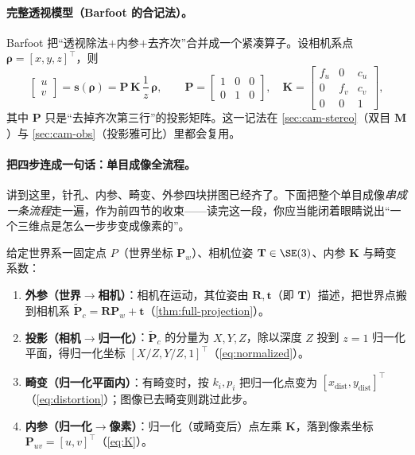\paragraph{完整透视模型（Barfoot 的合记法）。}
Barfoot\cite{barfoot2024state} 把“透视除法$+$内参$+$去齐次”合并成一个紧凑算子。设相机系点 $\boldsymbol\rho=[x,y,z]^\top$，则
\begin{equation}
  \begin{bmatrix}u\\v\end{bmatrix}=\mathbf{s}(\boldsymbol\rho)=\mathbf{P}\,\mathbf{K}\,\frac1z\,\boldsymbol\rho,\qquad
  \mathbf{P}=\begin{bmatrix}1&0&0\\0&1&0\end{bmatrix},\quad
  \mathbf{K}=\begin{bmatrix}f_u&0&c_u\\0&f_v&c_v\\0&0&1\end{bmatrix},
  \label{eq:complete-perspective}
\end{equation}
其中 $\mathbf{P}$ 只是“去掉齐次第三行”的投影矩阵。这一记法在 \cref{sec:cam-stereo}（双目 $\mathbf{M}$）与 \cref{sec:cam-obs}（投影雅可比）里都会复用。

\paragraph{把四步连成一句话：单目成像全流程。}
讲到这里，针孔、内参、畸变、外参四块拼图已经齐了。下面把整个单目成像\emph{串成一条流程}走一遍，作为前四节的收束\cite{gaoxiang2019slam14}——读完这一段，你应当能闭着眼睛说出“一个三维点是怎么一步步变成像素的”。

\begin{algo}[单目相机成像全流程]\label{alg:cam-pipeline}
给定世界系一固定点 $P$（世界坐标 $\mathbf{P}_w$）、相机位姿 $\mathbf{T}\in\SE(3)$、内参 $\mathbf{K}$ 与畸变系数：
\begin{enumerate}
  \item \textbf{外参（世界$\to$相机）}：相机在运动，其位姿由 $\mathbf{R},\mathbf{t}$（即 $\mathbf{T}$）描述，把世界点搬到相机系 $\tilde{\mathbf{P}}_c=\mathbf{R}\mathbf{P}_w+\mathbf{t}$（\cref{thm:full-projection}）。
  \item \textbf{投影（相机$\to$归一化）}：$\tilde{\mathbf{P}}_c$ 的分量为 $X,Y,Z$，除以深度 $Z$ 投到 $z=1$ 归一化平面，得归一化坐标 $[X/Z,Y/Z,1]^\top$（\cref{eq:normalized}）。
  \item \textbf{畸变（归一化平面内）}：有畸变时，按 $k_i,p_i$ 把归一化点变为 $[x_{\text{dist}},y_{\text{dist}}]^\top$（\cref{eq:distortion}）；图像已去畸变则跳过此步。
  \item \textbf{内参（归一化$\to$像素）}：归一化（或畸变后）点左乘 $\mathbf{K}$，落到像素坐标 $\mathbf{P}_{uv}=[u,v]^\top$（\cref{eq:K}）。
\end{enumerate}
\end{algo}

